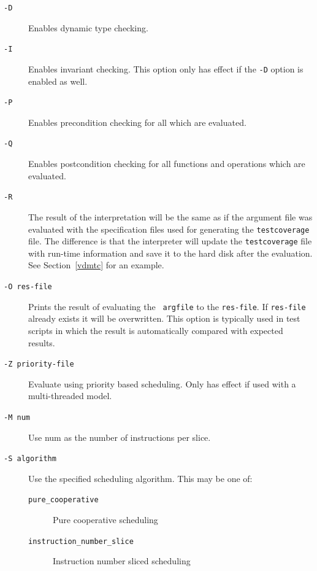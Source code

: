 \documentclass[\pformat,12pt]{article}
\begin{document}
\begin{description}

\item[{\tt -D}] Enables dynamic type checking.
  
\item[{\tt -I}] Enables invariant checking. This option only has effect if the {\tt -D} option is enabled as well.

\item[{\tt -P}] Enables precondition checking for all
which are evaluated. 

\item[{\tt -Q}] Enables postcondition checking for all functions and
operations which are evaluated.

\item[{\tt -R}] 
  The result of the interpretation will be the same as if the argument
  file was evaluated with the specification files used for generating
  the {\tt testcoverage} file. The difference is that the interpreter
  will update the {\tt testcoverage} file with run-time information and
  save it to the hard disk after the evaluation. See Section~\ref{vdmtc}
  for an example.
  
\item[{\tt -O res-file}] Prints the result of evaluating the {\tt
    argfile} to the {\tt res-file}. If {\tt res-file} already exists
  it will be overwritten. This option is typically used in test
  scripts in which the result is automatically compared with expected
  results.

\item[{\tt -Z priority-file}] Evaluate using priority based
  scheduling. Only has effect if used with a multi-threaded model.


\item[{\tt -M num}] Use num as the number of instructions per slice.
\item[{\tt -S algorithm}] Use the specified scheduling algorithm. This may be one of:
  \begin{description}
  \item[{\tt pure\_cooperative}] Pure cooperative scheduling
  \item[{\tt instruction\_number\_slice}] Instruction number sliced scheduling
  \end{description}


\end{description}
\end{document}
